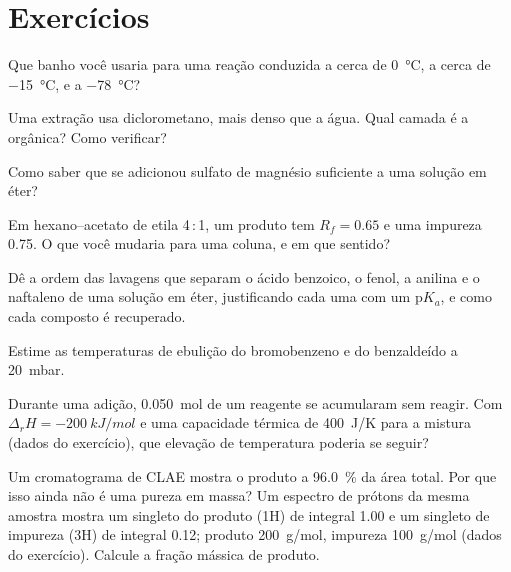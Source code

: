 \section{Exercícios}

\begin{exercise}[$\star$]\label{exo:b2:lab-techniques-2:1}
Que banho você usaria para uma reação conduzida a cerca de \qty{0}{\degreeCelsius}, a cerca de
\qty{-15}{\degreeCelsius}, e a \qty{-78}{\degreeCelsius}?
\end{exercise}

\begin{exercise}[$\star$]\label{exo:b2:lab-techniques-2:2}
Uma extração usa diclorometano, mais denso que a água. Qual camada é a orgânica? Como verificar?
\end{exercise}

\begin{exercise}[$\star$]\label{exo:b2:lab-techniques-2:3}
Como saber que se adicionou sulfato de magnésio suficiente a uma solução em éter?
\end{exercise}

\begin{exercise}[$\star$]\label{exo:b2:lab-techniques-2:4}
Em hexano--acetato de etila 4\,:\,1, um produto tem $R_f = 0.65$ e uma impureza 0.75. O que você mudaria
para uma coluna, e em que sentido?
\end{exercise}

\begin{exercise}[$\star\star$]\label{exo:b2:lab-techniques-2:5}
Dê a ordem das lavagens que separam o ácido benzoico, o fenol, a anilina e o naftaleno de uma solução
em éter, justificando cada uma com um $\mathrm pK_a$, e como cada composto é recuperado.
\end{exercise}

\begin{exercise}[$\star\star$]\label{exo:b2:lab-techniques-2:6}
Estime as temperaturas de ebulição do bromobenzeno e do benzaldeído a \qty{20}{mbar}.
\end{exercise}

\begin{exercise}[$\star\star$]\label{exo:b2:lab-techniques-2:7}
Durante uma adição, \qty{0.050}{mol} de um reagente se acumularam sem reagir. Com $\Delta_rH =
\qty{-200}{kJ/mol}$ e uma capacidade térmica de \qty{400}{J/K} para a mistura (dados do exercício), que
elevação de temperatura poderia se seguir?
\end{exercise}

\begin{exercise}[$\star\star$]\label{exo:b2:lab-techniques-2:8}
Um cromatograma de CLAE mostra o produto a 96.0~\% da área total. Por que isso ainda não é uma pureza em
massa? Um espectro de prótons da mesma amostra mostra um singleto do produto (1H) de integral 1.00 e um
singleto de impureza (3H) de integral 0.12; produto \qty{200}{g/mol}, impureza \qty{100}{g/mol} (dados do
exercício). Calcule a fração mássica de produto.
\end{exercise}

